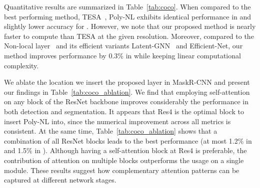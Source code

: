 \documentclass[10pt,twocolumn,letterpaper]{article}
\begin{document}
Quantitative results are summarized in Table~\ref{tab:coco}. When compared to the best performing method, TESA~\cite{babiloni2020tesa}, Poly-NL exhibits identical performance in  and slightly lower accuracy for . However, we note that our proposed method is nearly  faster to compute than TESA at the given resolution. Moreover, compared to the Non-local layer~\cite{wang2018non} and its efficient variants Latent-GNN~\cite{zhang2019latentgnn} and Efficient-Net, our method improves performance by 0.3\%   in  while keeping linear computational complexity.

We ablate the location we insert the proposed layer in MaskR-CNN and present our findings in Table~\ref{tab:coco_ablation}. We find that employing self-attention on any block of the ResNet backbone improves considerably the performance in both detection and segmentation. It appears that Res4 is the optimal block to insert Poly-NL into, since the numerical improvement across all metrics is consistent. At the same time, Table~\ref{tab:coco_ablation} shows that a combination of all ResNet blocks leads to the best performance (at most 1.2\%   in   and 1.5\%   in ). Although having a self-attention block at Res4 is preferable, the contribution of attention on multiple blocks outperforms the usage on a single module. These results suggest how complementary attention patterns can be captured at different network stages. 
\end{document}
